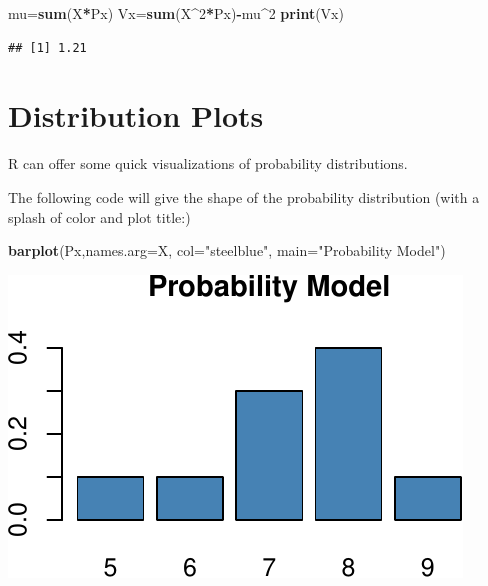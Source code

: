 \documentclass[
]{book}
\newenvironment{Shaded}{\begin{snugshade}}{\end{snugshade}}
\newcommand{\AttributeTok}[1]{\textcolor[rgb]{0.13,0.29,0.53}{#1}}
\newcommand{\DecValTok}[1]{\textcolor[rgb]{0.00,0.00,0.81}{#1}}
\newcommand{\FunctionTok}[1]{\textcolor[rgb]{0.13,0.29,0.53}{\textbf{#1}}}
\newcommand{\NormalTok}[1]{#1}
\newcommand{\OtherTok}[1]{\textcolor[rgb]{0.56,0.35,0.01}{#1}}
\newcommand{\SpecialCharTok}[1]{\textcolor[rgb]{0.81,0.36,0.00}{\textbf{#1}}}
\newcommand{\StringTok}[1]{\textcolor[rgb]{0.31,0.60,0.02}{#1}}
\theoremstyle{definition}
\theoremstyle{definition}
\theoremstyle{definition}
\theoremstyle{definition}
\theoremstyle{remark}
\begin{document}
\begin{Shaded}
\begin{Highlighting}[]
\NormalTok{mu}\OtherTok{=}\FunctionTok{sum}\NormalTok{(X}\SpecialCharTok{*}\NormalTok{Px)}
\NormalTok{Vx}\OtherTok{=}\FunctionTok{sum}\NormalTok{(X}\SpecialCharTok{\^{}}\DecValTok{2}\SpecialCharTok{*}\NormalTok{Px)}\SpecialCharTok{{-}}\NormalTok{mu}\SpecialCharTok{\^{}}\DecValTok{2}
\FunctionTok{print}\NormalTok{(Vx)}
\end{Highlighting}
\end{Shaded}

\begin{verbatim}
## [1] 1.21
\end{verbatim}

\section{Distribution Plots}\label{distribution-plots}

R can offer some quick visualizations of probability distributions.

The following code will give the shape of the probability distribution (with a splash of color and plot title:)

\begin{Shaded}
\begin{Highlighting}[]
\FunctionTok{barplot}\NormalTok{(Px,}\AttributeTok{names.arg=}\NormalTok{X, }\AttributeTok{col=}\StringTok{"steelblue"}\NormalTok{, }\AttributeTok{main=}\StringTok{"Probability Model"}\NormalTok{)}
\end{Highlighting}
\end{Shaded}

\includegraphics{math340-notes_files/figure-latex/unnamed-chunk-133-1.pdf}
\end{document}
